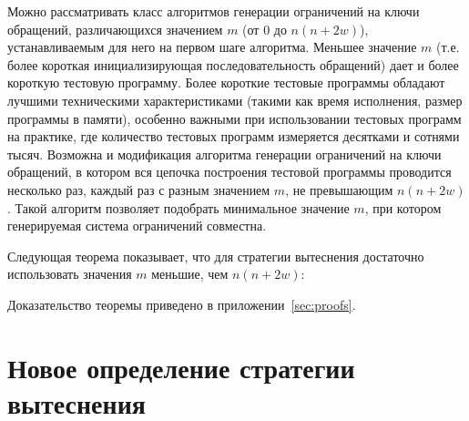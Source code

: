 Можно рассматривать класс алгоритмов генерации ограничений на ключи обращений, различающихся значением $m$ (от 0 до $n(n+2w)$), устанавливаемым для него на первом шаге алгоритма. Меньшее значение $m$ (т.е. более короткая инициализирующая последовательность обращений) дает и более короткую тестовую программу. Более короткие тестовые программы обладают лучшими техническими характеристиками (такими как время исполнения, размер программы в памяти), особенно важными при использовании тестовых программ на практике, где количество тестовых программ измеряется десятками и сотнями тысяч. Возможна и модификация алгоритма генерации ограничений на ключи обращений, в котором вся цепочка построения тестовой программы проводится несколько раз, каждый раз с разным значением $m$, не превышающим $n(n+2w)$. Такой алгоритм позволяет подобрать минимальное значение $m$, при котором генерируемая система ограничений совместна.

Следующая теорема показывает, что для стратегии вытеснения \LRU достаточно использовать значения $m$ меньшие, чем $n(n+2w)$:

\begin{theorem}\label{thm_mirror_lenth_lru} \UpperBoundLRUMirror
\end{theorem}
Доказательство теоремы приведено в приложении~\ref{sec:proofs}.





\section{Новое определение стратегии вытеснения\\ \PseudoLRU}\label{sec:plru_new_definition}

